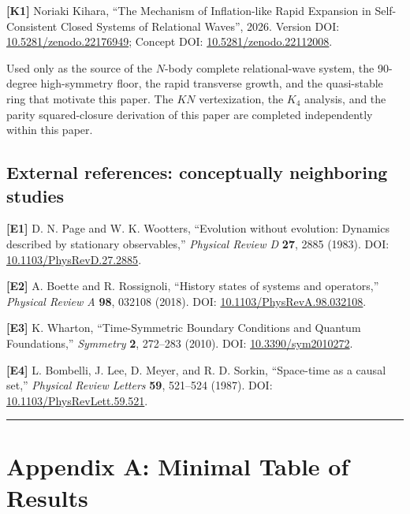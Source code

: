 \documentclass[
  a4paper,
]{article}
\begin{document}
\textbf{{[}K1{]}} Noriaki Kihara, ``The Mechanism of Inflation-like
Rapid Expansion in Self-Consistent Closed Systems of Relational Waves'',
2026. Version DOI:
\href{https://doi.org/10.5281/zenodo.22176949}{10.5281/zenodo.22176949};
Concept DOI:
\href{https://doi.org/10.5281/zenodo.22112008}{10.5281/zenodo.22112008}.

Used only as the source of the \(N\)-body complete relational-wave
system, the 90-degree high-symmetry floor, the rapid transverse growth,
and the quasi-stable ring that motivate this paper. The \(KN\)
vertexization, the \(K_4\) analysis, and the parity squared-closure
derivation of this paper are completed independently within this paper.

\subsection{External references: conceptually neighboring
studies}\label{external-references-conceptually-neighboring-studies}

\textbf{{[}E1{]}} D. N. Page and W. K. Wootters, ``Evolution without
evolution: Dynamics described by stationary observables,''
\emph{Physical Review D} \textbf{27}, 2885 (1983). DOI:
\href{https://doi.org/10.1103/PhysRevD.27.2885}{10.1103/PhysRevD.27.2885}.

\textbf{{[}E2{]}} A. Boette and R. Rossignoli, ``History states of
systems and operators,'' \emph{Physical Review A} \textbf{98}, 032108
(2018). DOI:
\href{https://doi.org/10.1103/PhysRevA.98.032108}{10.1103/PhysRevA.98.032108}.

\textbf{{[}E3{]}} K. Wharton, ``Time-Symmetric Boundary Conditions and
Quantum Foundations,'' \emph{Symmetry} \textbf{2}, 272--283 (2010). DOI:
\href{https://doi.org/10.3390/sym2010272}{10.3390/sym2010272}.

\textbf{{[}E4{]}} L. Bombelli, J. Lee, D. Meyer, and R. D. Sorkin,
``Space-time as a causal set,'' \emph{Physical Review Letters}
\textbf{59}, 521--524 (1987). DOI:
\href{https://doi.org/10.1103/PhysRevLett.59.521}{10.1103/PhysRevLett.59.521}.

\begin{center}\rule{0.5\linewidth}{0.5pt}\end{center}

\section{Appendix A: Minimal Table of
Results}\label{appendix-a-minimal-table-of-results}
\end{document}
